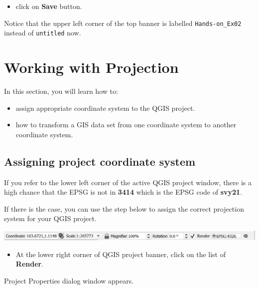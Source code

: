 \documentclass[
  letterpaper,
  DIV=11,
  numbers=noendperiod]{scrreprt}
\providecommand{\tightlist}{%
  \setlength{\itemsep}{0pt}\setlength{\parskip}{0pt}}\usepackage{longtable,booktabs,array}
\begin{document}
\begin{itemize}
\tightlist
\item
  click on \textbf{Save} button.
\end{itemize}

Notice that the upper left corner of the top banner is labelled
\texttt{Hands-on\_Ex02} instead of \texttt{untitled} now.

\hypertarget{working-with-projection}{%
\section{Working with Projection}\label{working-with-projection}}

In this section, you will learn how to:

\begin{itemize}
\tightlist
\item
  assign appropriate coordinate system to the QGIS project.
\item
  how to transform a GIS data set from one coordinate system to another
  coordinate system.
\end{itemize}

\hypertarget{assigning-project-coordinate-system}{%
\subsection{Assigning project coordinate
system}\label{assigning-project-coordinate-system}}

If you refer to the lower left corner of the active QGIS project window,
there is a high chance that the EPSG is not in \textbf{3414} which is
the EPSG code of \textbf{svy21}.

If there is the case, you can use the step below to assign the correct
projection system for your QGIS project.

\includegraphics{./img02/image9.jpg}

\begin{itemize}
\tightlist
\item
  At the lower right corner of QGIS project banner, click on the list of
  \textbf{Render}.
\end{itemize}

Project Properties dialog window appears.
\end{document}
